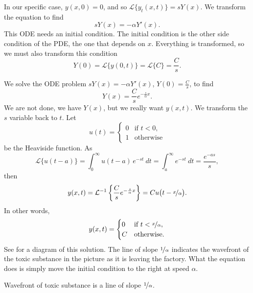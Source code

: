 \begin{example}
In our specific case,
$y(x,0)=0$, and so
${\mathcal L} \bigl\{ y_t(x,t) \bigr\} = sY(x)$.  We transform the equation
to find
\begin{equation*}
sY(x) = -\alpha Y'(x) .
\end{equation*}
This ODE needs an initial condition.  The initial condition is the
other side condition of the PDE\@, the one that depends on $x$.  Everything
is transformed, so we must also transform this condition
\begin{equation*}
Y(0) = 
{\mathcal L} \bigl\{ y(0,t) \bigr\} 
=
{\mathcal L} \bigl\{ C \bigr\} 
=
\frac{C}{s} .
\end{equation*}

We solve the ODE problem $sY(x) = -\alpha Y'(x)$, $Y(0) = \frac{C}{s}$, to find
\begin{equation*}
Y(x) = \frac{C}{s} e^{-\frac{s}{\alpha} x} .
\end{equation*}
We are not done, we have $Y(x)$, but we really want $y(x,t)$.  We 
transform the $s$ variable back to $t$.
Let 
\begin{equation*}
u(t) = \begin{cases} 0 & \text{if $t < 0$}, \\ 1 & \text{otherwise}
\end{cases}
\end{equation*}
be the Heaviside function.
As
\begin{equation*}
{\mathcal L} \bigl\{ u(t-a) \bigr\} =
\int_0^\infty u(t-a) \, e^{-st} ~dt
=
\int_a^\infty e^{-st} ~dt
=
\frac{e^{-as}}{s} ,
\end{equation*}
then
\begin{equation*}
y(x,t) = {\mathcal L}^{-1} \left\{
\frac{C}{s} e^{-\frac{s}{\alpha} x}
\right\}
=
C u\bigl(t-\nicefrac{x}{\alpha}\bigr) .
\end{equation*}
In other words,
\begin{equation*}
y(x,t) =
\begin{cases}
0 & \text{if $t < \nicefrac{x}{\alpha}$}, \\
C & \text{otherwise.}
\end{cases}
\end{equation*}
See  for a diagram of this
solution.  The line of slope $\nicefrac{1}{\alpha}$ indicates
the wavefront of the toxic substance in the picture as it is leaving the
factory.
What the equation does is simply move the initial condition to the right at
speed $\alpha$.

\begin{myfig}
\capstart
{}
\caption{Wavefront of toxic substance is a line of slope
$\nicefrac{1}{\alpha}$.\label{lt:half-infinite-goo-river-wavefront}}
\end{myfig}



\end{example}
